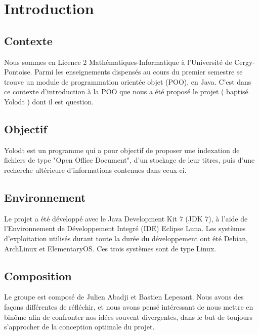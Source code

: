 \section{Introduction} %

\subsection{Contexte}
Nous sommes en Licence 2 Mathématiques-Informatique à l'Université de Cergy-Pontoise. Parmi les enseignements dispensés au cours du premier semestre se trouve un module de programmation orientée objet (POO), en Java. C'est dans ce contexte d'introduction à la POO que nous a été proposé le projet ( baptisé Yolodt ) dont il est question.
\subsection{Objectif}
Yolodt est un programme qui a pour objectif de proposer une indexation de fichiers de type "Open Office Document", d'un stockage de leur titres, puis d'une recherche ultérieure d'informations contenues dans ceux-ci.
\subsection{Environnement}
Le projet a été développé avec le Java Development Kit 7 (JDK 7), à l'aide de l'Environnement de Développement Integré (IDE) Eclipse Luna. 
Les systèmes d'exploitation utilisés durant toute la durée du développement ont été Debian, ArchLinux et ElementaryOS. 
Ces trois systèmes sont de type Linux.
\subsection{Composition}
Le groupe est composé de Julien Abadji et Bastien Lepesant. Nous avons des façons différentes de réfléchir, et nous avons pensé intéressant de nous mettre en binôme afin de confronter nos idées souvent divergentes, dans le but de toujours s'approcher de la conception optimale du projet.  %